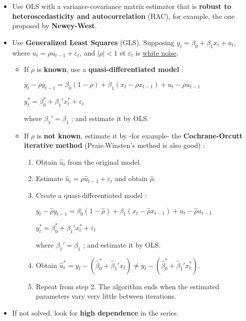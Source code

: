 \begin{f}[Correction]

\begin{itemize}[leftmargin=*]
\item Use OLS with a variance-covariance matrix estimator that is \textbf{robust to heteroscedasticity and autocorrelation} (HAC), for example, the one proposed by \textbf{Newey-West}.
\item Use \textbf{Generalized Least Squares} (GLS). Supposing \(y_{t} = \beta_{0} + \beta_{1} x_{t} + u_{t}\), where \(u_{t} = \rho u_{t - 1}+ \varepsilon_{t}\), and \(\lvert \rho \rvert < 1\) et \(\varepsilon_{t}\) is \underline{white noise}.

\begin{itemize}[leftmargin=*]
\item If \(\rho\) is \textbf{known}, use a \textbf{quasi-differentiated model} :

\begin{center}
	\(y_{t} - \rho y_{t - 1}= \beta_{0} (1 - \rho) + \beta_{1} (x_{t} - \rho x_{t - 1}) + u_{t} - \rho u_{t - 1}\)
	
	\(y_{t}^{*} = \beta_{0}^{*} + \beta_{1}' x_{t}^{*} + \varepsilon_{t}\)
\end{center}

where \(\beta_{1}' = \beta_{1}\) ; and estimate it by OLS.

\item If \(\rho\) is \textbf{not known}, estimate it by -for example- the \textbf{Cochrane-Orcutt iterative method} (Prais-Winsten's method is also good) :

\begin{enumerate}[leftmargin=*]
	\item Obtain \(\hat{u}_{t}\) from the original model.
	\item Estimate \(\hat{u}_{t} = \rho \hat{u}_{t-1} + \varepsilon_{t}\) and obtain \(\hat{\rho}\).
	\item Create a quasi-differentiated model :
	
	\begin{center}
		\(y_{t} - \hat{\rho}y_{t - 1} = \beta_{0} (1 - \hat{\rho}) + \beta_{1} (x_{t} - \hat{\rho} x_{t - 1}) + u_{t} - \hat{\rho}u_{t - 1}\)
		
		\(y_{t}^{*} = \beta_{0}^{*} + \beta_{1}' x_{t}^{*} + \varepsilon_{t}\)
	\end{center}
	
	where \(\beta_{1}' = \beta_{1}\) ; and estimate it by OLS.
	
	\item Obtain \(\hat{u}_{t}^{*} = y_{t} - (\hat{\beta}_{0}^{*} + \hat{\beta}_{1}' x_{t}) \neq y_ {t} - (\hat{\beta}_{0}^{*} + \hat{\beta}_{1}' x_{t}^{*})\).
	\item Repeat from step 2. The algorithm ends when the estimated parameters vary very little between iterations.
\end{enumerate}
\end{itemize}

\item If not solved, look for \textbf{high dependence} in the series.
\end{itemize}

\end{f}  
